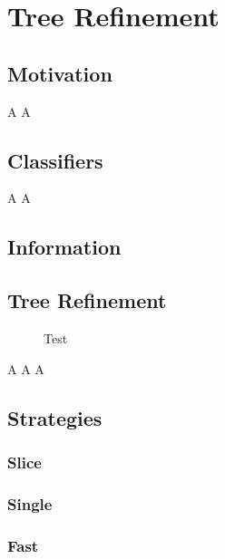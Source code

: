 \chapter{Tree Refinement}
\label{chap:tree}

	\clearpage
	
	\section{Motivation}
	
		A\clearpage
		A\clearpage
	
	\section{Classifiers}
	
		A\clearpage
		A\clearpage

	\section{Information}
	
		\clearpage

	\section{Tree Refinement}
	
		\begin{figure}[ht!]
			\centering
			
			\caption{Test}
			\label{fig:tree:binpackNOP}
		\end{figure}
	
		\clearpage
		A\clearpage
		A\clearpage
		A\clearpage
		
	\section{Strategies}
	
		\subsection{Slice}
			\clearpage
		
		\subsection{Single}
			\clearpage
		
		\subsection{Fast}
			\clearpage
		
